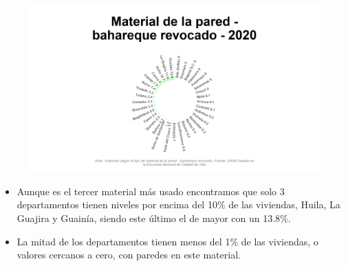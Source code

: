    \begin{figure}[H]
        \caption[Viviendas con pared de bahareque revocado por departamentos para 2020 ]{\label{pared_bahareque_revo_dptos} }
        \begin{center}
        \includegraphics[width=\textwidth,keepaspectratio]{img/var_154_static.png}
        \end{center}
    \end{figure}
            \begin{itemize}
                    \item Aunque es el tercer material más usado encontramos que solo 3 departamentos tienen niveles por encima del 10\% de las viviendas, Huila, La Guajira y Guainía, siendo este último el de mayor con un 13.8\%.
                    \item La mitad de los departamentos tienen menos del 1\% de las viviendas, o valores cercanos a cero, con paredes en este material.
                    \end{itemize}

